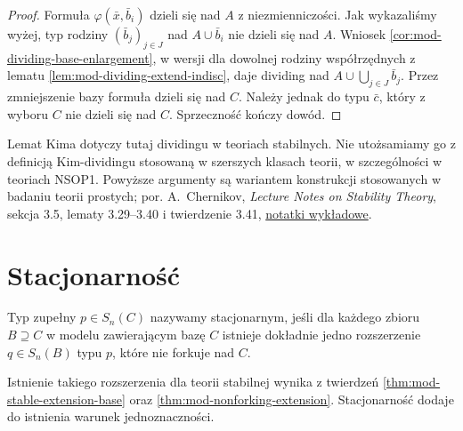 \begin{proof}
Formuła $\varphi(\bar x,\bar b_i)$
dzieli się nad $A$ z niezmienniczości.
Jak wykazaliśmy wyżej, typ rodziny
$(\bar b_j)_{j\in J}$ nad $A\cup\bar b_i$
nie dzieli się nad $A$.
Wniosek \ref{cor:mod-dividing-base-enlargement},
w wersji dla dowolnej rodziny współrzędnych
z lematu \ref{lem:mod-dividing-extend-indisc},
daje dividing nad $A\cup\bigcup_{j\in J}\bar b_j$.
Przez zmniejszenie bazy formuła dzieli się
nad $C$. Należy jednak do typu $\bar c$,
który z wyboru $C$ nie dzieli się nad $C$.
Sprzeczność kończy dowód.
\end{proof}

Lemat Kima dotyczy tutaj dividingu w teoriach
stabilnych. Nie utożsamiamy go z definicją
Kim-dividingu stosowaną w szerszych klasach
teorii, w szczególności w teoriach NSOP1.
Powyższe argumenty są wariantem konstrukcji
stosowanych w badaniu teorii prostych;
por. A.~Chernikov, \emph{Lecture Notes on Stability
Theory}, sekcja 3.5, lematy 3.29--3.40
i twierdzenie 3.41,
\href{https://www.math.ucla.edu/~chernikov/teaching/StabilityTheory285D/StabilityNotes.pdf}
{notatki wykładowe}.

\section{Stacjonarność}

\begin{definicja}
\label{def:mod-stationary-type}
Typ zupełny $p\in S_n(C)$ nazywamy stacjonarnym,
jeśli dla każdego zbioru $B\supseteq C$
w modelu zawierającym bazę $C$ istnieje
dokładnie jedno rozszerzenie $q\in S_n(B)$
typu $p$, które nie forkuje nad $C$.
\end{definicja}

Istnienie takiego rozszerzenia dla teorii
stabilnej wynika z twierdzeń
\ref{thm:mod-stable-extension-base} oraz
\ref{thm:mod-nonforking-extension}.
Stacjonarność dodaje do istnienia
warunek jednoznaczności.



